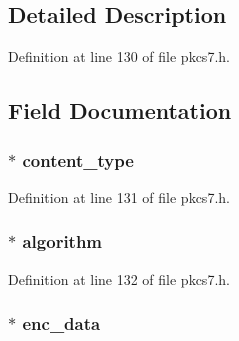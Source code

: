 \subsection{Detailed Description}


Definition at line 130 of file pkcs7.\+h.



\subsection{Field Documentation}
\subsubsection[{\texorpdfstring{content\+\_\+type}{content_type}}]{ $\ast$ content\+\_\+type}\hypertarget{structpkcs7__enc__content__st_a5967ebb0378512568b4332e9ddb213af}{}\label{structpkcs7__enc__content__st_a5967ebb0378512568b4332e9ddb213af}


Definition at line 131 of file pkcs7.\+h.

\subsubsection[{\texorpdfstring{algorithm}{algorithm}}]{ $\ast$ algorithm}\hypertarget{structpkcs7__enc__content__st_a6464dff2253362ccee1bfaf6c7abf0ca}{}\label{structpkcs7__enc__content__st_a6464dff2253362ccee1bfaf6c7abf0ca}


Definition at line 132 of file pkcs7.\+h.

\subsubsection[{\texorpdfstring{enc\+\_\+data}{enc_data}}]{ $\ast$ enc\+\_\+data}\hypertarget{structpkcs7__enc__content__st_a6431c24812ff29cc02897d8485767633}{}\label{structpkcs7__enc__content__st_a6431c24812ff29cc02897d8485767633}


